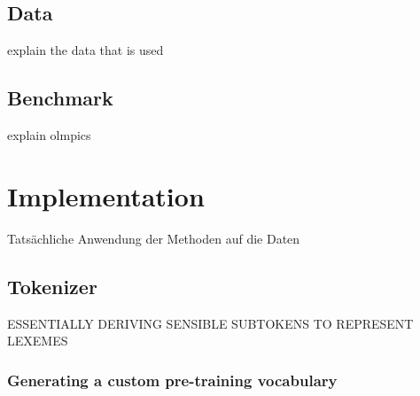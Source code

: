 \documentclass[english]{ttlab-qualify}
\begin{document}
    \subsection{Data}
    \label{subsec:data}
    explain the data that is used

    \subsection{Benchmark}
    \label{subsec:benchmark}
    explain olmpics

    \section{Implementation}
    \label{sec:implementation}

    Tatsächliche Anwendung der Methoden auf die Daten

    \subsection{Tokenizer}
    \uppercase{essentially deriving sensible subtokens to represent lexemes}
    \label{subsec:tokenizer-training}

    \subsubsection{Generating a custom pre-training vocabulary}
    \label{subsubsec:generating-a-custom-pre-training-vocabulary}
\end{document}

